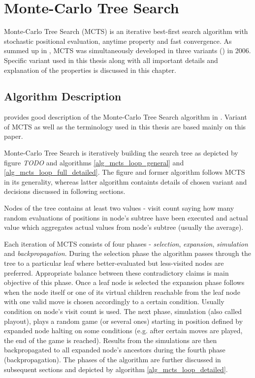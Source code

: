 \chapter{Monte-Carlo Tree Search}
\label{chap_mcts}

Monte-Carlo Tree Search (MCTS) is an iterative best-first search algorithm with stochastic positional
evaluation, anytime property and fast convergence. As \citeauthor{ChaslotPhd2010} summed up in 
\cite{ChaslotPhd2010}, MCTS was simultaneously developed
in three variants (\cites{Chaslot2006}{Coulom2006}{Kocsis2006}) in 2006. Specific variant used in
this thesis along with all important details and explanation of the properties is discussed in this
chapter.


\section{Algorithm Description}

\citeauthor{Chaslot2008} provides good description of the Monte-Carlo Tree Search algorithm in
\cite{Chaslot2008}. Variant of MCTS as well as the terminology used in this thesis are based mainly
on this paper.

Monte-Carlo Tree Search is iteratively building the search tree as depicted by figure
\emph{TODO}%
and algorithms \ref{alg_mcts_loop_general} and \ref{alg_mcts_loop_full_detailed}.
The figure and former algorithm
follows MCTS in its generality, whereas latter algorithm containts details of chosen variant and
decisions discussed in following sections.
  
Nodes of the tree contains at least two values - visit count
saying how many random evaluations of positions in node's subtree have been executed and actual
value which aggregates actual values from node's subtree (usually the average).

Each iteration of MCTS consists of four
phases - \emph{selection}, \emph{expansion}, \emph{simulation} and \emph{backpropagation}. During
the selection phase the 
algorithm passes through the tree to a particular leaf where better-evaluated but less-visited nodes
are preferred. Appropriate balance between these contradictory claims is main objective of this
phase. Once a leaf node is selected the expansion phase follows when the node itself or one of its
virtual children reachable from the leaf node with one valid move is chosen accordingly to a certain
condition. Usually condition on node's visit count is used.
The next phase, simulation (also called playout), plays a random game (or several ones) starting
in position defined by expanded node halting on some conditions (e.g. after certain moves are
played, the end of the game is reached). Results from the simulations are then backpropagated to all
expanded node's ancestors during the fourth phase (backpropagation). The phases of the algorithm are
further discussed in subsequent sections and depicted by algorithm
\ref{alg_mcts_loop_detailed}.

